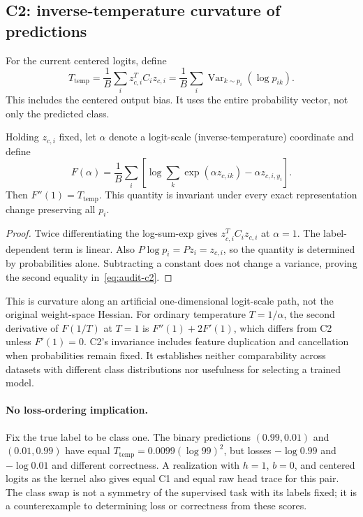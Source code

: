 \subsection{C2: inverse-temperature curvature of predictions}

For the current centered logits, define
\begin{equation}
    T_{\mathrm{temp}}=\frac{1}{B}\sum_i z_{c,i}^T C_i z_{c,i}
    =\frac{1}{B}\sum_i\operatorname{Var}_{k\sim p_i}(\log p_{ik}).
    \label{eq:audit-c2}
\end{equation}
This includes the centered output bias. It uses the entire probability vector, not only the predicted class.

\begin{lemma}%
\label{lemma:audit-temperature}
Holding $z_{c,i}$ fixed, let $\alpha$ denote a logit-scale (inverse-temperature) coordinate and define
\begin{equation}
    F(\alpha)=\frac{1}{B}\sum_i
    \left[\log\sum_k\exp(\alpha z_{c,ik})-\alpha z_{c,i,y_i}\right].
\end{equation}
Then $F''(1)=T_{\mathrm{temp}}$. This quantity is invariant under every exact representation change preserving all $p_i$.
\end{lemma}
\begin{proof}
Twice differentiating the log-sum-exp gives $z_{c,i}^T C_i z_{c,i}$ at $\alpha=1$. The label-dependent term is linear. Also $P\log p_i=Pz_i=z_{c,i}$, so the quantity is determined by probabilities alone. Subtracting a constant does not change a variance, proving the second equality in~\eqref{eq:audit-c2}.
\end{proof}

This is curvature along an artificial one-dimensional logit-scale path, not the original weight-space Hessian. For ordinary temperature $T=1/\alpha$, the second derivative of $F(1/T)$ at $T=1$ is $F''(1)+2F'(1)$, which differs from C2 unless $F'(1)=0$. C2's invariance includes feature duplication and cancellation when probabilities remain fixed. It establishes neither comparability across datasets with different class distributions nor usefulness for selecting a trained model.

\paragraph{No loss-ordering implication.}
Fix the true label to be class one. The binary predictions $(0.99,0.01)$ and $(0.01,0.99)$ have equal $T_{\mathrm{temp}}=0.0099{(\log 99)}^2$, but losses $-\log 0.99$ and $-\log 0.01$ and different correctness. A realization with $h=1$, $b=0$, and centered logits as the kernel also gives equal C1 and equal raw head trace for this pair. The class swap is not a symmetry of the supervised task with its labels fixed; it is a counterexample to determining loss or correctness from these scores.

